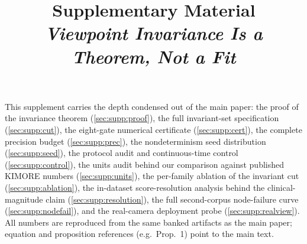 \documentclass[10pt,twocolumn,letterpaper]{article}
\begin{document}
\title{Supplementary Material\\
\emph{Viewpoint Invariance Is a Theorem, Not a Fit}}
\author{}
\maketitle

This supplement carries the depth condensed out of the main paper: the proof of the invariance theorem
(\cref{sec:supp:proof}), the full invariant-set specification (\cref{sec:supp:cut}), the eight-gate
numerical certificate (\cref{sec:supp:cert}), the complete precision budget (\cref{sec:supp:prec}), the
nondeterminism seed distribution (\cref{sec:supp:seed}), the protocol audit and continuous-time
control (\cref{sec:supp:control}), the units audit behind our comparison against published KIMORE
numbers (\cref{sec:supp:units}), the per-family ablation of the invariant cut
(\cref{sec:supp:ablation}), the in-dataset score-resolution analysis behind the clinical-magnitude
claim (\cref{sec:supp:resolution}), the full second-corpus node-failure curve
(\cref{sec:supp:nodefail}), and the real-camera deployment probe (\cref{sec:supp:realview}). All numbers are reproduced from the same banked artifacts as the main
paper; equation and proposition references (e.g.\ Prop.~1) point to the main text.

\end{document}
